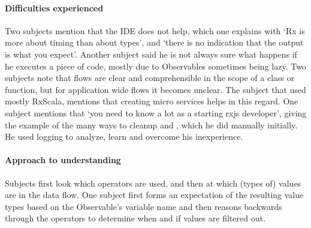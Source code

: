 \paragraph{Difficulties experienced}
Two subjects mention that the IDE does not help, which one explains with `Rx is more about timing than about types', and `there is no indication that the output is what you expect'. Another subject said he is not always sure what happens if he executes a piece of code, mostly due to Observables sometimes being lazy.
Two subjects note that flows are clear and comprehensible in the scope of a class or function, but for application wide flows it becomes unclear. The subject that used mostly RxScala, mentions that creating micro services helps in this regard. 
One subject mentions that `you need to know a lot as a starting {\lbrack}rxjs{\rbrack} developer', giving the example of the many ways to cleanup and , which he did manually initially. He used logging to analyze, learn and overcome his inexperience. 

\paragraph{Approach to understanding}
Subjects first look which operators are used, and then at which (types of) values are in the data flow. One subject first forms an expectation of the resulting value types based on the Observable's variable name and then reasons backwards through the operators to determine when and if values are filtered out.

